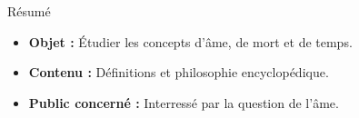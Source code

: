 \begin{center}
\Large
Résumé
\normalsize
\end{center}
\vspace{3cm}
\begin{itemize}[leftmargin=1cm, label=, itemsep=21pt]
\item {\bf Objet : } Étudier les concepts d'âme, de mort et de temps.
\item {\bf Contenu : } Définitions et philosophie encyclopédique.
\item {\bf Public concerné : } Interressé par la question de l'âme.
\end{itemize}

\vspace{3cm}


